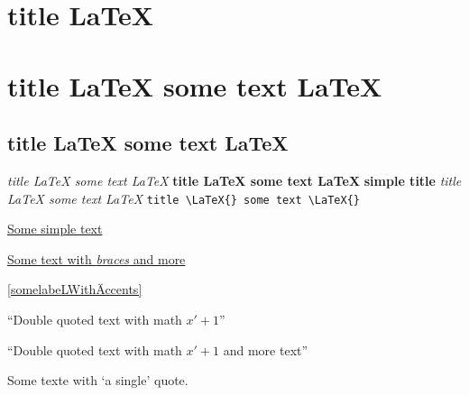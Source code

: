 \documentclass{article}
\begin{document}
\chapter{title \LaTeX{}}
\chapter{title \LaTeX{} some text \LaTeX{}}
\section{title \LaTeX{} some text \LaTeX{}}
\emph{title \LaTeX{} some text \LaTeX{}}
\textbf{title \LaTeX{} some text \LaTeX{}}
\textbf{simple title}
\textit{title \LaTeX{} some text {\LaTeX{}}}
\verb!title \LaTeX{} some text \LaTeX{}!


\underline{Some simple text}

\underline{Some text with {\em braces} and more}

\label{somelabeLWithÄccents}
\ref{somelabeLWithÄccents}

``Double quoted text with math $x'+1$''

``Double quoted text with math $x'+1$
and more text''

Some texte with `a single' quote.
\end{document}
